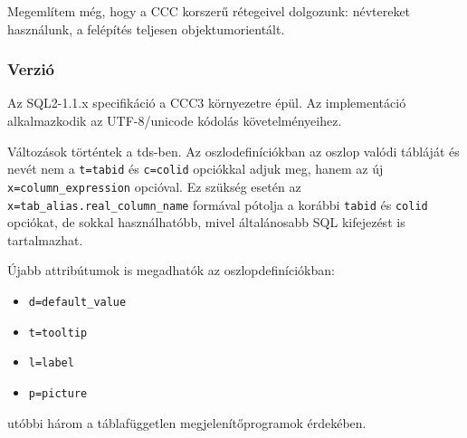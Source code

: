 Megemlítem még, hogy a CCC korszerű rétegeivel dolgozunk:
névtereket használunk, a felépítés teljesen objektumorientált.


%
%


\subsubsection*{Verzió}

Az SQL2-1.1.x specifikáció a CCC3 környezetre épül.
Az implementáció alkalmazkodik az UTF-8/unicode kódolás követelményeihez.  

Változások történtek a tds-ben. Az oszlodefiníciókban 
az oszlop valódi tábláját és nevét nem a \verb!t=tabid! és \verb!c=colid!
opciókkal adjuk meg, hanem az új \verb!x=column_expression! opcióval.
Ez szükség esetén az \verb!x=tab_alias.real_column_name! formával
pótolja a korábbi \verb!tabid! és \verb!colid! opciókat, de sokkal
használhatóbb, mivel általánosabb SQL kifejezést is tartalmazhat.

Újabb attribútumok is megadhatók az oszlopdefiníciókban:
\begin{itemize}
    \item{\tt d=default\_value}
    \item{\tt t=tooltip}
    \item{\tt l=label}
    \item{\tt p=picture}
\end{itemize}

utóbbi három a táblafüggetlen megjelenítőprogramok érdekében.
